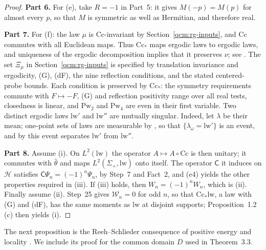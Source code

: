 \documentclass[11pt,letterpaper,reqno]{amsart}
\theoremstyle{definition}
\begin{document}
\begin{proof}
\textbf{Part 6.}
For (e), take $R=-1$ in Part~5: it gives $M(-p)=M(p)$ for almost every $p$, so that $M$ is symmetric as well as Hermitian, and therefore real.

\textbf{Part 7.}
For (f): the law $\mu$ is $\mathrm{Cc}$-invariant by Section~\ref{qcm:rg-inputs}, and $\mathrm{Cc}$ commutes with all Euclidean maps.
Thus $\mathrm{Cc}_*$ maps ergodic laws to ergodic laws, and uniqueness of the ergodic decomposition implies that it preserves $\nu$; see \cite[Section~7.5]{QEDConstruction}.
The set $\Xi_\mu$ in Section~\ref{qcm:rg-inputs} is specified by translation invariance and ergodicity, (G), (dF), the nine reflection conditions, and the stated centered-probe bounds. Each condition is preserved by $\mathrm{Cc}_*$: the symmetry requirements commute with $F\mapsto-F$, (G) and reflection positivity range over all real tests, closedness is linear, and $\mathrm{Pw}_2$ and $\mathrm{Pw}_4$ are even in their first variable.
Two distinct ergodic laws $\mathrm{lw}'$ and $\mathrm{lw}''$ are mutually singular.
Indeed, let $\lambda$ be their mean; one-point sets of laws are measurable by \cite[Section~7.5]{QEDConstruction}, so that $\{\lambda_\omega=\mathrm{lw}'\}$ is an event, and by \cite[Section~7.5]{QEDConstruction} this event separates $\mathrm{lw}'$ from $\mathrm{lw}''$.

\textbf{Part 8.}
Assume (i).
On $L^2(\mathrm{lw})$ the operator $A\mapsto A\circ\mathrm{Cc}$ is then unitary; it commutes with $\hat\theta$ and maps $L^2(\Sigma_+,\mathrm{lw})$ onto itself.
The operator $\mathsf C$ it induces on $\mathcal H$ satisfies $\mathsf C\Psi_n=(-1)^n\Psi_n$, by Step~7 and Fact~2, and (e4) yields the other properties required in (iii).
If (iii) holds, then $W_n=(-1)^nW_n$, which is (ii).
Finally assume (ii).
Step~25 gives $\mathcal W_n=0$ for odd $n$, so that $\mathrm{Cc}_*\mathrm{lw}$, a law with (G) and (dF), has the same moments as $\mathrm{lw}$ at disjoint supports; Proposition~1.2\,(c) then yields (i).
\end{proof}

The next proposition is the Reeh--Schlieder consequence of positive
energy and locality \cite{ReehSchlieder1961}. We include its proof for
the common domain $D$ used in Theorem~3.3.
\end{document}
